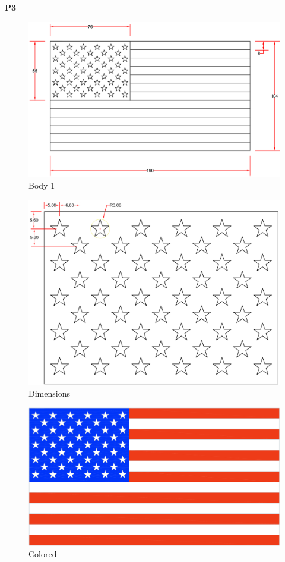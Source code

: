 \documentclass{article}
\begin{document}
\textbf{P3}\\
\begin{minipage}[T]{.6\linewidth}
\begin{figure}[H]
  \centering
  \includegraphics[width=.9\linewidth]{images/3a.png}  
  \caption{Body 1}
  \label{fig:3}
\end{figure}
\end{minipage}
\begin{minipage}[c]{.4\linewidth}
\begin{figure}[H]
  \centering
  \includegraphics[width=\linewidth]{images/3b.png}  
  \caption{Dimensions}
  \label{fig:4}
\end{figure}
\begin{figure}[H]
  \centering
  \includegraphics[width=.6\linewidth]{images/3c.png}
  \caption{Colored}
  \label{fig:5}
\end{figure}
\end{minipage}
\end{document}

